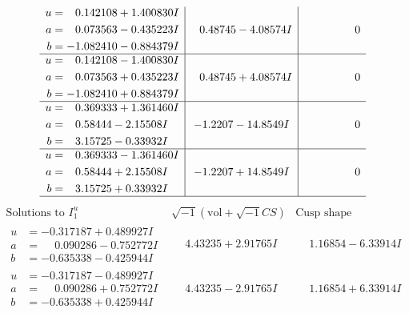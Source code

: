 \documentclass[1p]{elsarticle_modified}
\theoremstyle{definition}
\newcommand{\I}{\sqrt{-1}}
\begin{document}
$$\begin{array}{c|c|c}
\begin{aligned}
u &= \phantom{-}0.142108 + 1.400830 I \\
a &= \phantom{-}0.073563 - 0.435223 I \\
b &= -1.082410 - 0.884379 I\end{aligned}
 & \phantom{-}0.48745 - 4.08574 I & \phantom{-0.000000 } 0 \\ \hline\begin{aligned}
u &= \phantom{-}0.142108 - 1.400830 I \\
a &= \phantom{-}0.073563 + 0.435223 I \\
b &= -1.082410 + 0.884379 I\end{aligned}
 & \phantom{-}0.48745 + 4.08574 I & \phantom{-0.000000 } 0 \\ \hline\begin{aligned}
u &= \phantom{-}0.369333 + 1.361460 I \\
a &= \phantom{-}0.58444 - 2.15508 I \\
b &= \phantom{-}3.15725 - 0.33932 I\end{aligned}
 & -1.2207 - 14.8549 I & \phantom{-0.000000 } 0 \\ \hline\begin{aligned}
u &= \phantom{-}0.369333 - 1.361460 I \\
a &= \phantom{-}0.58444 + 2.15508 I \\
b &= \phantom{-}3.15725 + 0.33932 I\end{aligned}
 & -1.2207 + 14.8549 I & \phantom{-0.000000 } 0\\
 \hline 
 \end{array}$$\newpage$$\begin{array}{c|c|c}  
\text{Solutions to }I^u_{1}& \I (\text{vol} + \sqrt{-1}CS) & \text{Cusp shape}\\
 \hline 
\begin{aligned}
u &= -0.317187 + 0.489927 I \\
a &= \phantom{-}0.090286 - 0.752772 I \\
b &= -0.635338 - 0.425944 I\end{aligned}
 & \phantom{-}4.43235 + 2.91765 I & \phantom{-}1.16854 - 6.33914 I \\ \hline\begin{aligned}
u &= -0.317187 - 0.489927 I \\
a &= \phantom{-}0.090286 + 0.752772 I \\
b &= -0.635338 + 0.425944 I\end{aligned}
 & \phantom{-}4.43235 - 2.91765 I & \phantom{-}1.16854 + 6.33914 I \\ \hline\begin{aligned}

\end{aligned}
\end{array}$$
\end{document}
